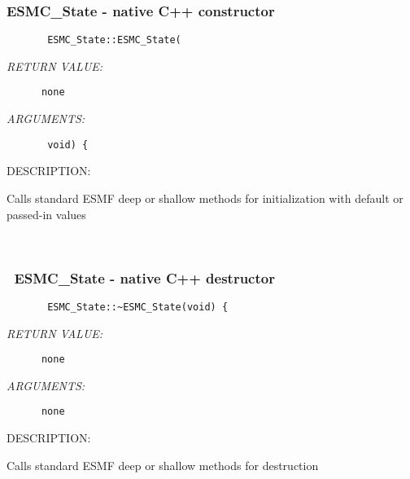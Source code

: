 \subsubsection{ESMC\_State - native C++ constructor}


  
\begin{verbatim}       ESMC_State::ESMC_State(\end{verbatim}{\em RETURN VALUE:}
\begin{verbatim}      none\end{verbatim}{\em ARGUMENTS:}
\begin{verbatim}       void) {\end{verbatim}
{\sf DESCRIPTION:\\ }


        Calls standard ESMF deep or shallow methods for initialization
        with default or passed-in values
   
 
\mbox{}\hrulefill\ 
 
\subsubsection{~ESMC\_State - native C++ destructor}


  
\begin{verbatim}       ESMC_State::~ESMC_State(void) {\end{verbatim}{\em RETURN VALUE:}
\begin{verbatim}      none\end{verbatim}{\em ARGUMENTS:}
\begin{verbatim}      none\end{verbatim}
{\sf DESCRIPTION:\\ }


        Calls standard ESMF deep or shallow methods for destruction
  
